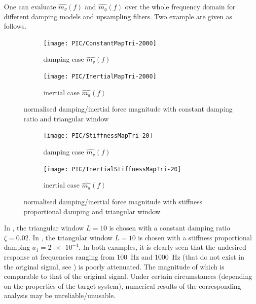 One can evaluate $\hat{m_v}\left(f\right)$ and $\hat{m_a}\left(f\right)$ over the whole frequency domain for different damping models and upsampling filters. Two example are given as follows.
\begin{figure}[htb!]
\centering
\begin{subfigure}{.48\textwidth}
\texttt{[image: PIC/ConstantMapTri-2000]}
\caption{damping case $\hat{m_v}\left(f\right)$}
\end{subfigure}
\begin{subfigure}{.48\textwidth}
\texttt{[image: PIC/InertialMapTri-2000]}
\caption{inertial case $\hat{m_a}\left(f\right)$}
\end{subfigure}
\caption{normalised damping/inertial force magnitude with constant damping ratio and triangular window}\label{fig:map_constant}
\end{figure}
\begin{figure}[htb!]
\centering
\begin{subfigure}{.48\textwidth}
\texttt{[image: PIC/StiffnessMapTri-20]}
\caption{damping case $\hat{m_v}\left(f\right)$}
\end{subfigure}
\begin{subfigure}{.48\textwidth}
\texttt{[image: PIC/InertialStiffnessMapTri-20]}
\caption{inertial case $\hat{m_a}\left(f\right)$}
\end{subfigure}
\caption{normalised damping/inertial force magnitude with stiffness proportional damping and triangular window}\label{fig:map_stiffness}
\end{figure}
In , the triangular window $L=10$ is chosen with a constant damping ratio $\zeta=\num{0.02}$. In , the triangular window $L=10$ is chosen with a stiffness proportional damping $a_1=\num{2e-4}$. In both examples, it is clearly seen that the undesired response at frequencies ranging from \SI{100}{\hertz} and \SI{1000}{\hertz} (that do not exist in the original signal, see ) is poorly attenuated. The magnitude of which is comparable to that of the original signal. Under certain circumstances (depending on the properties of the target system), numerical results of the corresponding analysis may be unreliable/unusable.
